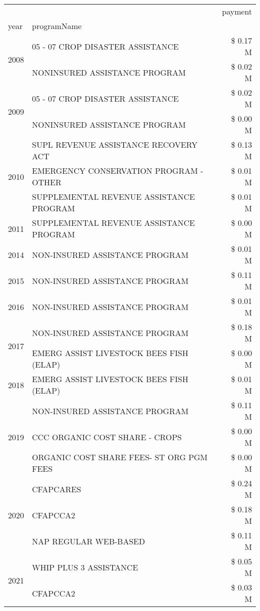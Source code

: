 \begin{tabular}{llr}
\toprule
 &  & payment \\
year & programName &  \\
\midrule
\multirow[t]{2}{*}{2008} & 05 - 07 CROP DISASTER ASSISTANCE & \$ 0.17 M \\
 & NONINSURED ASSISTANCE PROGRAM & \$ 0.02 M \\
\cline{1-3}
\multirow[t]{2}{*}{2009} & 05 - 07 CROP DISASTER ASSISTANCE & \$ 0.02 M \\
 & NONINSURED ASSISTANCE PROGRAM & \$ 0.00 M \\
\cline{1-3}
\multirow[t]{3}{*}{2010} & SUPL REVENUE ASSISTANCE RECOVERY ACT & \$ 0.13 M \\
 & EMERGENCY CONSERVATION PROGRAM - OTHER & \$ 0.01 M \\
 & SUPPLEMENTAL REVENUE ASSISTANCE PROGRAM & \$ 0.01 M \\
\cline{1-3}
2011 & SUPPLEMENTAL REVENUE ASSISTANCE PROGRAM & \$ 0.00 M \\
\cline{1-3}
2014 & NON-INSURED ASSISTANCE PROGRAM & \$ 0.01 M \\
\cline{1-3}
2015 & NON-INSURED ASSISTANCE PROGRAM & \$ 0.11 M \\
\cline{1-3}
2016 & NON-INSURED ASSISTANCE PROGRAM                & \$ 0.01 M \\
\cline{1-3}
\multirow[t]{2}{*}{2017} & NON-INSURED ASSISTANCE PROGRAM & \$ 0.18 M \\
 & EMERG ASSIST LIVESTOCK BEES FISH (ELAP) & \$ 0.00 M \\
\cline{1-3}
2018 & EMERG ASSIST LIVESTOCK BEES FISH (ELAP) & \$ 0.01 M \\
\cline{1-3}
\multirow[t]{3}{*}{2019} & NON-INSURED ASSISTANCE PROGRAM & \$ 0.11 M \\
 & CCC ORGANIC COST SHARE - CROPS & \$ 0.00 M \\
 & ORGANIC COST SHARE FEES- ST ORG PGM FEES & \$ 0.00 M \\
\cline{1-3}
\multirow[t]{3}{*}{2020} & CFAPCARES & \$ 0.24 M \\
 & CFAPCCA2 & \$ 0.18 M \\
 & NAP REGULAR WEB-BASED & \$ 0.11 M \\
\cline{1-3}
\multirow[t]{2}{*}{2021} & WHIP PLUS 3 ASSISTANCE & \$ 0.05 M \\
 & CFAPCCA2 & \$ 0.03 M \\
\cline{1-3}
\bottomrule
\end{tabular}
